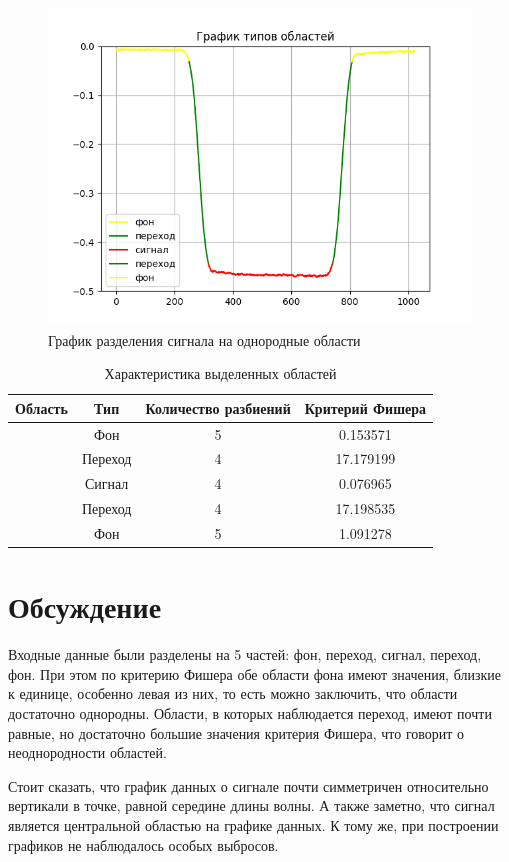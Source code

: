 \documentclass[12pt,a4paper]{article}
\begin{document}
\begin{figure}[H]
    \centering
    \includegraphics[scale=0.8]{zones.png}
    \caption{График разделения сигнала на однородные области}
\end{figure}
\begin{table}[H]
    \centering
    \begin{tabular}{|c|c|c|c|}
        \hline
        Область & Тип & Количество разбиений & Критерий Фишера\\\hline
        [0, 250] & Фон & 5 & 0.153571\\\hline
        [250, 317] & Переход & 4 & 17.179199\\\hline
        [317, 741] & Сигнал & 4 & 0.076965\\\hline
        [741, 808] & Переход & 4 & 17.198535\\\hline
        [808, 1023] & Фон & 5 & 1.091278\\\hline
    \end{tabular}
    \caption{Характеристика выделенных областей}
\end{table}

\section{Обсуждение}
Входные данные были разделены на 5 частей: фон, переход, сигнал, переход, фон. При этом по критерию Фишера обе области фона имеют значения, близкие к единице, особенно левая из них, то есть можно заключить, что области достаточно однородны. Области, в которых наблюдается переход, имеют почти равные, но достаточно большие значения критерия Фишера, что говорит о неоднородности областей.

Стоит сказать, что график данных о сигнале почти симметричен относительно вертикали в точке, равной середине длины волны. А также заметно, что сигнал является центральной областью на графике данных. К тому же, при построении графиков не наблюдалось особых выбросов.
\end{document}
